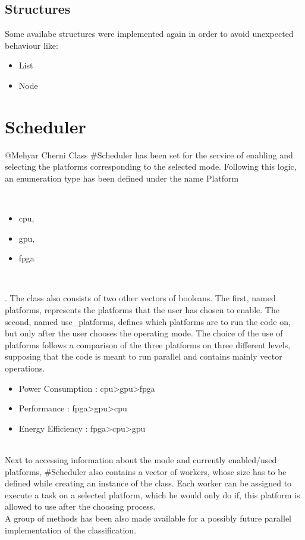 \documentclass[parskip=full]{scrartcl}
\newcommand\tab[1][1cm]{\hspace*{#1}}
\begin{document}
	\subsection{Structures} \label{Structures}
		\tab Some availabe structures were implemented again in order to avoid unexpected behaviour like:
		\begin{itemize}
			\item List
			\item Node
		\end{itemize} 
		
\pagebreak

\section{Scheduler} \label{Scheduler}
	@Mehyar Cherni
	\tab Class #Scheduler has been set for the service of enabling and selecting the platforms corresponding to the selected mode. Following this logic, an enumeration type has been defined under the name Platform { \\ 
	\begin {itemize}
		\item cpu, 
		\item gpu, 
		\item fpga
	\end{itemize} \\
	}. The class also consists of two other vectors of booleans. The first, named platforms, represents the platforms that the user has chosen to enable. The second, named use_platforms, defines which platforms are to run the code on, but only after the user chooses the operating mode. The choice of the use of platforms follows a comparison of the three platforms on three different levels, supposing that the code is meant to run parallel and contains mainly vector operations. \\
	\begin {itemize}
		\item Power Consumption : cpu>gpu>fpga
		\item Performance : fpga>gpu>cpu
		\item Energy Efficiency : fpga>cpu>gpu
	\end{itemize}
\\ Next to accessing information about the mode and currently enabled/used platforms, #Scheduler also contains a vector of workers, whose size has to be defined while creating an instance of the class. Each worker can be assigned to execute a task on a selected platform, which he would only do if, this platform is allowed to use after the choosing process. \\A group of methods has been also made available for a possibly future parallel implementation of the classification.\\
\end{document}

